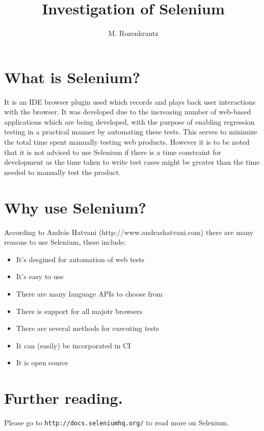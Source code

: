 \documentclass{article}
\title{Investigation of Selenium}
\author{M. Rozenkrantz}
\date{}
\begin{document}
\maketitle

\section{What is Selenium?}
It is an IDE browser plugin used which records and plays back user interactions with the browser. It was developed due to the increasing number of web-based applications which are being developed, with the purpose of enabling regression testing in a practical manner by automating these tests. This serves to minimize the total time spent manually testing web products. However it is to be noted that it is not advised to use Selenium if there is a time constraint for development as the time taken to write test cases might be greater than the time needed to manually test the product.

\section{Why use Selenium?}
According to András Hatvani (http://www.andrashatvani.com) there are many reasons to use Selenium, these include:
\begin{itemize}
\item{It's desgined for automation of web tests}
\item{It's easy to use}
\item{There are many language APIs to choose from}
\item{There is support for all majotr browsers}
\item{There are several methods for executing tests}
\item{It can (easily) be incorporated in CI}
\item{It is open source}
\end{itemize}


\section{Further reading.}
Please go to \verb#http://docs.seleniumhq.org/# to read more on Selenium.
\end{document}
